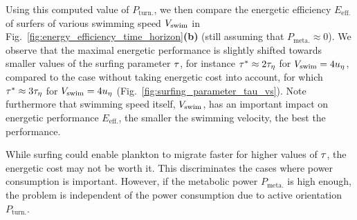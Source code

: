 Using this computed value of $P_{\mathrm{turn.}}$, we then compare the energetic efficiency $E_{\mathrm{eff.}}$ of surfers of various swimming speed $V_{\mathrm{swim}}$ in Fig.~\ref{fig:energy_efficiency_time_horizon}\textbf{(b)} (still assuming that $P_{\mathrm{meta.}} \approx 0$).
We observe that the maximal energetic performance is slightly shifted towards smaller values of the surfing parameter $\tau$, for instance $\tau^* \approx 2 \tau_{\eta}$ for $V_{\mathrm{swim}} = 4 u_{\eta}$, compared to the case without taking energetic cost into account, for which $\tau^* \approx 3 \tau_{\eta}$ for $V_{\mathrm{swim}} = 4 u_{\eta}$ (Fig.~\ref{fig:surfing_parameter_tau_vs}).
Note furthermore that swimming speed itself, $V_{\mathrm{swim}}$, has an important impact on energetic performance $E_{\mathrm{eff.}}$, the smaller the swimming velocity, the best the performance.


While surfing could enable plankton to migrate faster for higher values of $\tau$, the energetic cost may not be worth it.
This discriminates the cases where power consumption is important.
However, if the metabolic power $P_{\mathrm{meta.}}$ is high enough, the problem is independent of the power consumption due to active orientation $P_{\mathrm{turn.}}$.

